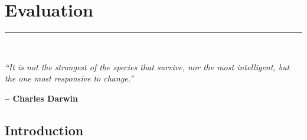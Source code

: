 \graphicspath{{content/chapters/5_evaluation/figures/}}

\chapter{Evaluation}%
\label{chp:evaluation}
\rule{\textwidth}{1pt} \\[1ex]

\epigraph{\textit{``It is not the strongest of the species that survive, nor the most intelligent, but the one most responsive to change.''}}{\textbf{-- Charles Darwin}}

\section{Introduction}
\label{sec:5_introduction}



